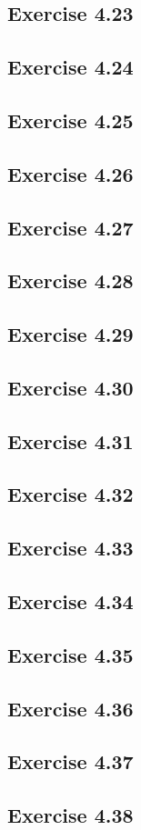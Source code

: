 \documentclass[../Marcus.tex]{subfiles}
\begin{document}
\subsection*{Exercise 4.23}

\subsection*{Exercise 4.24}

\subsection*{Exercise 4.25}

\subsection*{Exercise 4.26}

\subsection*{Exercise 4.27}

\subsection*{Exercise 4.28}

\subsection*{Exercise 4.29}

\subsection*{Exercise 4.30}

\subsection*{Exercise 4.31}

\subsection*{Exercise 4.32}

\subsection*{Exercise 4.33}

\subsection*{Exercise 4.34}

\subsection*{Exercise 4.35}

\subsection*{Exercise 4.36}

\subsection*{Exercise 4.37}

\subsection*{Exercise 4.38}
\phantom{}
\end{document}
